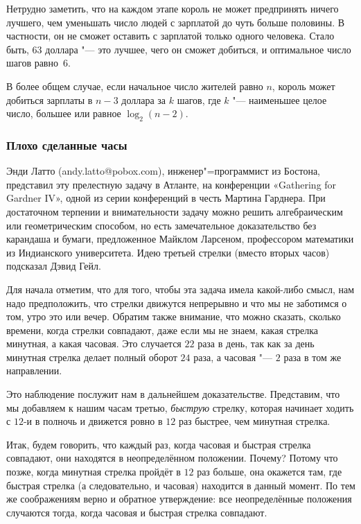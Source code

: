 \documentclass[twoside]{book}
\begin{document}
Нетрудно заметить, что на каждом этапе король не может предпринять ничего лучшего, чем уменьшать число людей с зарплатой до чуть больше половины.
В частности, он не сможет оставить с зарплатой только одного человека.
Стало быть, $63$ доллара "--- это лучшее, чего он сможет добиться, и оптимальное число шагов равно~$6$.
\heart

В более общем случае, если начальное число жителей равно $n$, король может добиться зарплаты в $n-3$ доллара за $k$ шагов, где $k$ "--- наименьшее целое число, большее или равное $\log_2(n-2)$.

\subsubsection*{Плохо сделанные часы}%

Энди Латто %
(andy.latto@pobox.com), инженер"=программист из Бостона, представил эту прелестную задачу в Атланте, на конференции «Gathering for Gard\-ner IV», одной из серии конференций в честь Мартина Гарднера.
При достаточном терпении и внимательности задачу можно решить алгебраическим или геометрическим способом, но есть замечательное доказательство без карандаша и бумаги, предложенное Майклом Ларсеном, %
профессором математики из Индианского университета.
Идею третьей стрелки (вместо вторых часов) подсказал Дэвид Гейл. %

\medskip

Для начала отметим, что для того, чтобы эта задача имела какой-либо смысл, нам надо предположить, что стрелки движутся непрерывно и что мы не заботимся о том, утро это или вечер.
Обратим также внимание, что можно сказать, сколько времени, когда стрелки совпадают, даже если мы не знаем, какая стрелка минутная, а какая часовая.
Это случается $22$ раза в день, так как за день минутная стрелка делает полный оборот $24$ раза, а часовая "--- $2$ раза в том же направлении.

Это наблюдение послужит нам в дальнейшем доказательстве.
Представим, что мы добавляем к нашим часам третью, \emph{быструю} стрелку, которая начинает ходить с $12$-и в полночь и движется ровно в $12$ раз быстрее, чем минутная стрелка.

Итак, будем говорить, что каждый раз, когда часовая и быстрая стрелка совпадают, они находятся в неопределённом положении.
Почему?
Потому что позже, когда минутная стрелка пройдёт в $12$ раз больше, она окажется там, где быстрая стрелка (а следовательно, и часовая) находится в данный момент.
По тем же соображениям верно и обратное утверждение: все неопределённые положения случаются тогда, когда часовая и быстрая стрелка совпадают.
\end{document}
